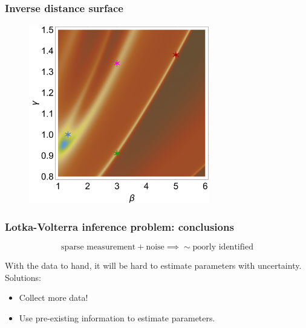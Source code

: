 \documentclass[handout]{beamer}
\begin{document}
\begin{frame}
	\frametitle{Inverse distance surface}
	
	\begin{figure}[ht]
		\centerline{\includegraphics[width=0.7\textwidth]{./figures/lotka-volterra-inference-big.png}}
	\end{figure}
	
\end{frame}

\begin{frame}
	\frametitle{Lotka-Volterra inference problem: conclusions}
	
	\begin{equation}
	\text{sparse measurement} + \text{noise} \implies \sim \text{poorly identified}
	\end{equation}
	
	With the data to hand, it will be hard to estimate parameters with uncertainty. Solutions:
	
	\begin{itemize}
		\item Collect more data!
		\item Use pre-existing information to estimate parameters.
	\end{itemize}
	
\end{frame}
\end{document}
